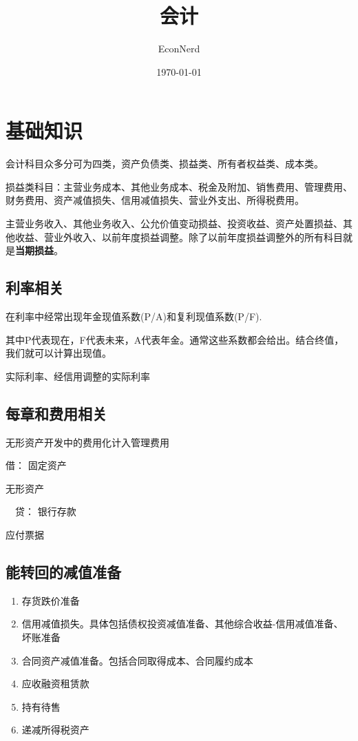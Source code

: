 \documentclass[UTF8,12pt]{ctexart}
\title{会计} %
\author{EconNerd}
\date{\today}
\newenvironment{Dr}{\noindent 借：}{\par}
\newenvironment{Cr}{\noindent \ \ 贷：}{\par}
\numberwithin{equation}{section} %
\numberwithin{figure}{section}
\numberwithin{table}{section}
\begin{document}
	\maketitle
	\tableofcontents
	\newpage
	
	\section{基础知识}
	
	会计科目众多分可为四类，资产负债类、损益类、所有者权益类、成本类。
	
	损益类科目：主营业务成本、其他业务成本、税金及附加、销售费用、管理费用、财务费用、资产减值损失、信用减值损失、营业外支出、所得税费用。
	
	主营业务收入、其他业务收入、公允价值变动损益、投资收益、资产处置损益、其他收益、营业外收入、以前年度损益调整。除了以前年度损益调整外的所有科目就是\textbf{当期损益}。
	
	\subsection{利率相关}
	在利率中经常出现年金现值系数(P/A)和复利现值系数(P/F).
	
	其中P代表现在，F代表未来，A代表年金。通常这些系数都会给出。结合终值，我们就可以计算出现值。
	
	实际利率、经信用调整的实际利率
	
	\subsection{每章和费用相关}
	无形资产开发中的费用化计入管理费用

	\begin{Dr}
		固定资产 \par
		无形资产
	\end{Dr}
	\begin{Cr}
		银行存款
		
		应付票据
	\end{Cr}

	\subsection{能转回的减值准备}
	\begin{enumerate}
		\item 存货跌价准备
		
		\item 信用减值损失。具体包括债权投资减值准备、其他综合收益-信用减值准备、坏账准备
		
		\item 合同资产减值准备。包括合同取得成本、合同履约成本
		
		\item 应收融资租赁款
		
		\item 持有待售
		
		\item 递减所得税资产
	\end{enumerate}
	
\end{document}
